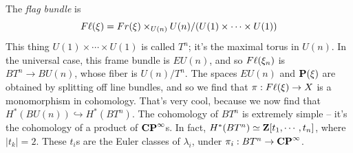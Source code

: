 The \emph{flag bundle} is
$$F\ell(\xi) = Fr(\xi)\times_{U(n)} U(n)/(U(1)\times\cdots\times U(1))$$
This thing $U(1)\times\cdots\times U(1)$ is called $T^n$; it's the maximal torus in $U(n)$.
In the universal case, this frame bundle is $EU(n)$, and so $F\ell(\xi_n)$ is $BT^n\to BU(n)$, whose fiber is $U(n)/T^n$.
The spaces $EU(n)$ and $\mathbf P(\xi)$ are obtained by splitting off line bundles, and so we find that $\pi:F\ell(\xi)\to X$ is a monomorphism in cohomology.
That's very cool, because we now find that $H^\ast(BU(n)) \hookrightarrow H^\ast(BT^n)$.
The cohomology of $BT^n$ is extremely simple -- it's the cohomology of a product of $\mathbf{CP}^\infty$s.
In fact, $H^\ast(BT^n) \simeq \mathbf Z[t_1,\cdots,t_n]$, where $|t_k| = 2$.
These $t_i$s are the Euler classes of $\lambda_i$, under $\pi_i:BT^n\to\mathbf{CP}^\infty$.
